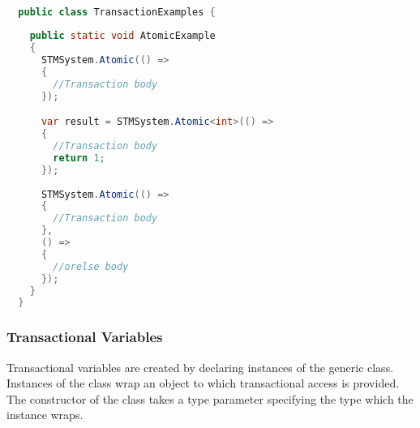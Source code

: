 \begin{lstlisting}[label=lst:library_atomic,
  caption={Library Transaction Declaration},
  language=Java,  
  showspaces=false,
  showtabs=false,
  breaklines=true,
  showstringspaces=false,
  breakatwhitespace=true,
  commentstyle=\color{greencomments},
  keywordstyle=\color{bluekeywords},
  stringstyle=\color{redstrings},
  morekeywords={atomic, retry, orElse, var, get, set}]  % Start your code-block

  public class TransactionExamples {
    
    public static void AtomicExample
    {
      STMSystem.Atomic(() =>
      {
        //Transaction body
      });

      var result = STMSystem.Atomic<int>(() =>
      {
        //Transaction body
        return 1;
      });
      
      STMSystem.Atomic(() =>
      {
        //Transaction body
      },
      () =>
      {
        //orelse body
      });
    }
  }
\end{lstlisting}

\subsubsection{Transactional Variables}
Transactional variables are created by declaring instances of the generic  class. Instances of the  class wrap an object to which transactional access is provided.  The constructor of the  class takes a type parameter specifying the type which the  instance wraps.

